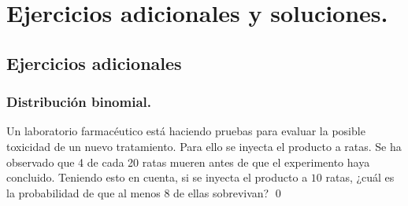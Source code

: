 \documentclass[10pt,a4paper]{article}\usepackage[]{graphicx}\usepackage[]{color}
\newcounter{EjerAdicionales}
\begin{document}
\section{Ejercicios adicionales y soluciones.}
\label{tut05:sec:EjerciciosAdicionalesYSoluciones}

\subsection*{Ejercicios adicionales}
\label{tut05:subsec:EjerciciosAdicionales}

\subsubsection*{Distribución binomial.}


\begin{ejercicio}
\label{tut05:ejercicio30}
Un laboratorio farmacéutico está haciendo pruebas para evaluar la posible toxicidad de un nuevo tratamiento. Para ello se inyecta el producto a ratas. Se ha observado que 4 de cada 20 ratas mueren antes de que el experimento haya concluido. Teniendo esto en cuenta, si se inyecta el producto a $10$ ratas, ¿cuál es la probabilidad de que al menos $8$ de ellas sobrevivan?
\qed
\end{ejercicio}
\end{document}
